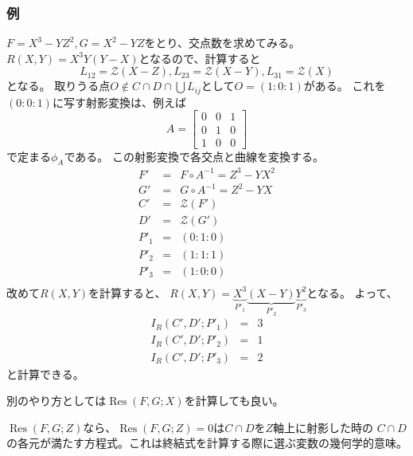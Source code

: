 \documentclass[a4]{article}
\newcommand{\Res}{\operatorname{Res}}
\begin{document}
        \subsubsection{例}
        $F=X^3-YZ^2,G=X^2-YZ$をとり、交点数を求めてみる。
        $R(X,Y)=X^3 Y (Y-X)$となるので、計算すると
        \[ L_{12}=\mathcal{Z}(X-Z), L_{23}=\mathcal{Z}(X-Y),L_{31}=\mathcal{Z}(X) \]
        となる。
        取りうる点$O \not \in C \cap D \cap \bigcup{L_{ij}}$として$O=(1:0:1)$がある。
        これを$(0:0:1)$に写す射影変換は、例えば
        \[
            A=
            \begin{bmatrix}
                0& 0& 1 \\
                0& 1& 0 \\
                1& 0& 0
            \end{bmatrix}
        \]
        で定まる$\phi_A$である。
        この射影変換で各交点と曲線を変換する。
        \begin{eqnarray*}
            F'&=&F \circ A^{-1} =Z^3-YX^2 \\
            G'&=&G \circ A^{-1} =Z^2-YX \\
            C'&=&\mathcal{Z}(F') \\
            D'&=&\mathcal{Z}(G') \\
            P'_{1}&=&(0:1:0) \\
            P'_{2}&=&(1:1:1) \\
            P'_{3}&=&(1:0:0) \\
        \end{eqnarray*}
        改めて$R(X,Y)$を計算すると、
        $R(X,Y)=\underbrace{X^3}_{P'_{1}} \underbrace{(X-Y)}_{P'_{2}} \underbrace{Y^2}_{P'_{3}}$となる。
        よって、
        \begin{eqnarray*}
            I_R(C',D'; P'_{1})&=&3 \\
            I_R(C',D'; P'_{2})&=&1 \\
            I_R(C',D'; P'_{3})&=&2
        \end{eqnarray*}
        と計算できる。

        別のやり方としては$\Res(F,G; X)$を計算しても良い。

        $\Res(F,G; Z)$なら、$\Res(F,G; Z)=0$は$C \cap D$を$Z$軸上に射影した時の
        $C \cap D$の各元が満たす方程式。これは終結式を計算する際に選ぶ変数の幾何学的意味。
\end{document}
